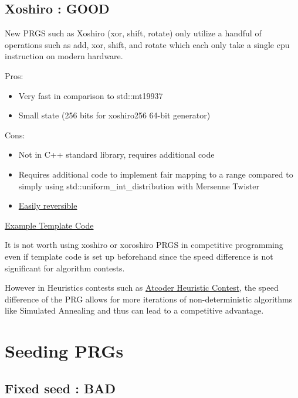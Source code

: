 \documentclass[12pt,a4paper]{article}
\begin{document}
\newpage
\subsection{Xoshiro : GOOD}\label{xoshiro-good}

New PRGS such as Xoshiro (xor, shift, rotate) only utilize a handful of
operations such as add, xor, shift, and rotate which each only take a
single cpu instruction on modern hardware.

Pros: 
\begin{itemize}
    \item Very fast in comparison to std::mt19937
    \item Small state (256 bits for xoshiro256 64-bit generator)
\end{itemize}

Cons:
\begin{itemize}
    \item Not in C++ standard library, requires additional code
    \item  Requires additional code to implement fair mapping to a range compared to simply using std::uniform\_int\_distribution with Mersenne Twister \cite{Lemire_2019}
    \item \href{https://github.com/takeuchi-masaki/hacking-hashing/blob/main/hashmap/reverse_splitmix.cpp}{Easily reversible}
\end{itemize}

\href{https://github.com/takeuchi-masaki/Competitive-Programming-Templates/blob/main/xoshiro256.cpp}{Example Template Code}

It is not worth using xoshiro or xoroshiro PRGS in competitive
programming even if template code is set up beforehand since the speed
difference is not significant for algorithm contests. 

However in Heuristics contests such as 
\href{https://atcoder.jp/?lang=en}{Atcoder Heuristic Contest}, the speed 
difference of the PRG allows for more iterations of non-deterministic 
algorithms like Simulated Annealing and thus can lead to a 
competitive advantage.

\section{Seeding PRGs}\label{seeding-prgs}

\subsection{Fixed seed : BAD}\label{fixed-seed-bad}
\end{document}
